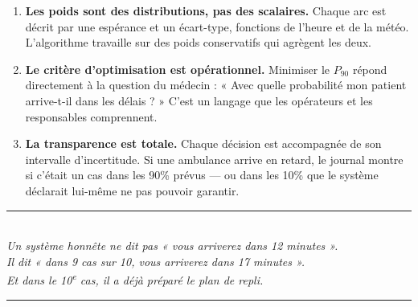 \documentclass[12pt,a4paper]{article}
\theoremstyle{definition}
\theoremstyle{remark}
\begin{document}
\begin{enumerate}[leftmargin=2em, itemsep=4pt]
  \item \textbf{Les poids sont des distributions, pas des scalaires.}
    Chaque arc est décrit par une espérance et un écart-type, fonctions
    de l'heure et de la météo. L'algorithme travaille sur des poids
    conservatifs qui agrègent les deux.

  \item \textbf{Le critère d'optimisation est opérationnel.}
    Minimiser le $P_{90}$ répond directement à la question du médecin :
    « Avec quelle probabilité mon patient arrive-t-il dans les délais ? »
    C'est un langage que les opérateurs et les responsables comprennent.

  \item \textbf{La transparence est totale.}
    Chaque décision est accompagnée de son intervalle d'incertitude.
    Si une ambulance arrive en retard, le journal montre si c'était
    un cas dans les 90\% prévus — ou dans les 10\% que le système
    déclarait lui-même ne pas pouvoir garantir.
\end{enumerate}

\medskip
\begin{center}
  {\color{twist}\rule{0.5\linewidth}{1pt}}\\[0.5em]
  {\itshape \og{}Un système honnête ne dit pas « vous arriverez dans 12 minutes ».\\
  Il dit « dans 9 cas sur 10, vous arriverez dans 17 minutes ».\\
  Et dans le 10\textsuperscript{e} cas, il a déjà préparé le plan de repli.\fg{}}\\[0.5em]
  {\color{twist}\rule{0.5\linewidth}{1pt}}
\end{center}
\end{document}
